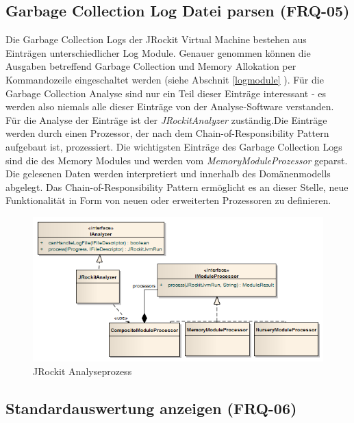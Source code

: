 \subsection{Garbage Collection Log Datei parsen (FRQ-05)}
Die Garbage Collection Logs der JRockit Virtual Machine bestehen aus Einträgen unterschiedlicher Log Module. Genauer genommen können die Ausgaben betreffend Garbage Collection und Memory Allokation per Kommandozeile eingeschaltet werden (siehe Abschnit \ref{logmodule} ). Für die Garbage Collection Analyse sind nur ein Teil dieser Einträge interessant - es werden also niemals alle dieser Einträge von der Analyse-Software verstanden. Für die Analyse der Einträge ist der \textit{JRockitAnalyzer} zuständig.Die Einträge werden durch einen Prozessor, der nach dem Chain-of-Responsibility Pattern\cite{wiki:chainOfResponsibilityPattern} aufgebaut ist, prozessiert. Die wichtigsten Einträge des Garbage Collection Logs sind die des Memory Modules und werden vom 
\textit{MemoryModuleProzessor} geparst. Die gelesenen Daten werden interpretiert und innerhalb des Domänenmodells abgelegt. Das Chain-of-Responsibility Pattern ermöglicht es an dieser Stelle, neue Funktionalität in Form von neuen oder erweiterten Prozessoren zu definieren.

 \begin{figure}[H]
  	\centering
    	\includegraphics[width=16cm]{images/jrockit_log_processing}
        	\caption{JRockit Analyseprozess}
\end{figure}

\subsection{Standardauswertung anzeigen (FRQ-06)}
